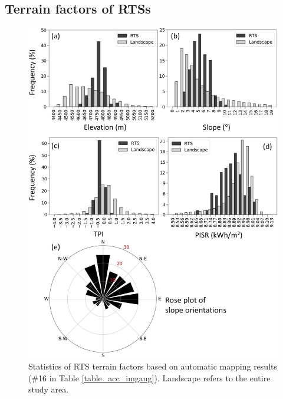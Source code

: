 \documentclass[authoryear,preprint,review,12pt]{elsarticle}
\begin{document}
\subsection{Terrain factors of RTSs}
\label{subsec_terrain}

\begin{figure}
	\centering
	\includegraphics[width=13cm]{figures/terrain_var_fig_mapped_trim.jpg}
	\caption{Statistics of RTS terrain factors based on automatic mapping results  (\#16 in Table \ref{table_acc_imgaug}). Landscape refers to the entire study area.}
	\label{fig_terrain_factors}
\end{figure}
\end{document}

